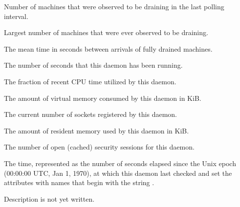 \begin{description}
\item[\AdAttr{MachinesDraining}:] Number of machines that were observed
  to be draining in the last polling interval.

\item[\AdAttr{MachinesDrainingPeak}:] Largest number of machines that were
ever observed to be draining.

\item[\AdAttr{MeanDrainedArrived}:] The mean time in seconds 
between arrivals of fully drained machines.

\item[\AdAttr{MonitorSelfAge}:] The number of seconds that this daemon
  has been running.

\item[\AdAttr{MonitorSelfCPUUsage}:] The fraction of recent CPU time utilized
  by this daemon. 

\item[\AdAttr{MonitorSelfImageSize}:] The amount of virtual memory consumed by
  this daemon in KiB.

\item[\AdAttr{MonitorSelfRegisteredSocketCount}:] The current number of sockets
  registered by this daemon.

\item[\AdAttr{MonitorSelfResidentSetSize}:] The amount of resident memory
  used by this daemon in KiB.

\item[\AdAttr{MonitorSelfSecuritySessions}:] The number of open (cached)
  security sessions for this daemon.

\item[\AdAttr{MonitorSelfTime}:] The  time, represented as the number of
  seconds elapsed since the Unix epoch (00:00:00 UTC, Jan 1, 1970),
  at which this daemon last checked and set the attributes with names that
  begin with the string .
  
\item[\AdAttr{MyAddress}:] Description is not yet written.


\end{description}
